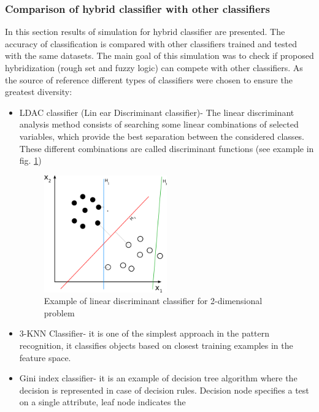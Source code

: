 \subsubsection{Comparison of hybrid classifier with other classifiers}
\label{cha:Simulation_reaearch_5}
In this section results of simulation for hybrid classifier are presented. 
The accuracy of classification is compared with other classifiers trained and 
tested with the same datasets. The main goal of this simulation was to check if proposed
hybridization (rough set and fuzzy logic) can compete with other classifiers. 
As the source of reference different types of classifiers were chosen to ensure the greatest diversity:
\begin{itemize}
    \item LDAC classifier (Lin ear Discriminant classifier)- The linear
        discriminant analysis method consists of searching some linear
        combinations of selected variables, which provide the best separation between the
        considered classes. These different combinations are called
        discriminant functions (see example in fig. \ref{fig:ldac_example})
        \begin{figure}[H]
            \begin{center}
                \includegraphics[width=0.5\textwidth, height=0.4\textwidth]{fig/ldac.png}
            \end{center}
            \caption{Example of linear discriminant classifier for 2-dimensional problem}
            \label{fig:ldac_example}
        \end{figure}
    \item 3-KNN Classifier- it is one of the simplest approach in the pattern
        recognition, it classifies objects based on closest training examples
        in the feature space.
    \item Gini index classifier- it is an example of decision tree algorithm
        where the decision is represented in case of decision rules.  Decision
        node specifies a test on a single attribute, leaf node indicates the

\end{itemize}
